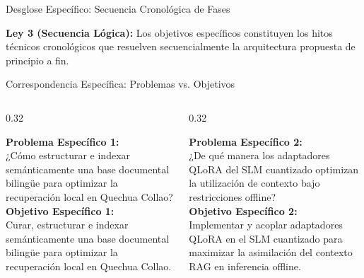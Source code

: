 \documentclass[aspectratio=169, 10pt, spanish]{beamer}
\begin{document}
\begin{frame}{Desglose Específico: Secuencia Cronológica de Fases}
    \vspace{0.2cm}
    \begin{tcolorbox}[colback=bpLightGray, colframe=bpBlue!70!black, width=13.5cm, center, arc=1.2mm, top=1.2mm, bottom=1.2mm]
        \centering\tiny\sffamily
        \textbf{\color{bpNavy}Ley 3 (Secuencia Lógica):} Los objetivos específicos constituyen los hitos técnicos cronológicos que resuelven secuencialmente la arquitectura propuesta de principio a fin.
    \end{tcolorbox}
\end{frame}

\begin{frame}{Correspondencia Específica: Problemas vs. Objetivos}
    \vspace{-0.3cm}
    \begin{columns}[T]
        \begin{column}{0.32\textwidth}
            \begin{tcolorbox}[enhanced, colback=white, colframe=bpBlue, title=\textbf{\scriptsize Nodo 1: Datos y Recuperación}, arc=1.5mm, left=1.5mm, right=1.5mm, top=1.5mm, bottom=1.5mm]
                \tiny
                \textbf{\color{bpBlue}Problema Específico 1:}\\
                ¿Cómo estructurar e indexar semánticamente una base documental bilingüe para optimizar la recuperación local en Quechua Collao?\\[0.15cm]
                \textbf{\color{bpBlue}Objetivo Específico 1:}\\
                Curar, estructurar e indexar semánticamente una base documental bilingüe para optimizar la recuperación local en Quechua Collao.
            \end{tcolorbox}
        \end{column}
        
        \begin{column}{0.32\textwidth}
            \begin{tcolorbox}[enhanced, colback=white, colframe=bpGold!90!black, title=\textbf{\scriptsize Nodo 2: Núcleo Técnico}, arc=1.5mm, left=1.5mm, right=1.5mm, top=1.5mm, bottom=1.5mm]
                \tiny
                \textbf{\color{bpGold!90!black}Problema Específico 2:}\\
                ¿De qué manera los adaptadores QLoRA del SLM cuantizado optimizan la utilización de contexto bajo restricciones offline?\\[0.15cm]
                \textbf{\color{bpGold!90!black}Objetivo Específico 2:}\\
                Implementar y acoplar adaptadores QLoRA en el SLM cuantizado para maximizar la asimilación del contexto RAG en inferencia offline.
            \end{tcolorbox}
        \end{column}


\end{columns}
\end{frame}
\end{document}
